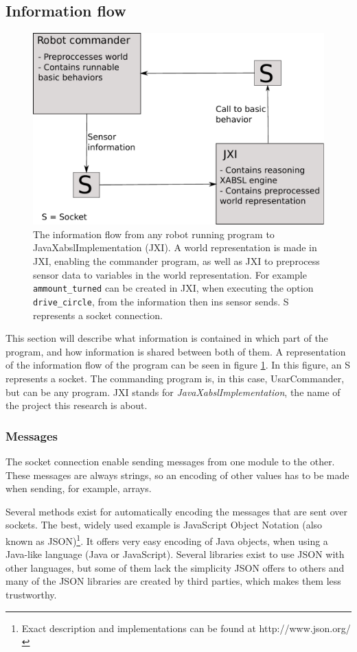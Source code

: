 \documentclass[a4paper,10pt]{article}
\begin{document}
\subsection{Information flow}
\begin{figure}
    \centering
    \includegraphics[width=.8\textwidth]{images/informationFlow.pdf}
    \caption{The information flow from any robot running program to
    JavaXabslImplementation (JXI). A world representation is made in JXI,
    enabling the commander program, as well as JXI to preprocess sensor data to
    variables in the world representation. For example \texttt{ammount\_turned}
    can be created in JXI, when executing the option \texttt{drive\_circle},
    from the information then ins sensor sends. S represents a socket
    connection.}
    \label{fig:information-flow}
\end{figure}
This section will describe what information is contained in which part of the
program, and how information is shared between both of them. A representation of
the information flow of the program can be seen in figure
\ref{fig:information-flow}. In this figure, an S represents a socket. The
commanding program is, in this case, UsarCommander, but can be any program. JXI
stands for \textit{JavaXabslImplementation}, the name of the project this research is
about.

\subsubsection{Messages}
The socket connection enable sending messages from one module to the other.
These messages are always strings, so an encoding of other values has to be made
when sending, for example, arrays.

Several methods exist for automatically encoding the messages that are sent over
sockets. The best, widely used example is JavaScript Object Notation (also known
as JSON)\footnote{Exact description and implementations can be found at
http://www.json.org/}. It offers very easy encoding of Java objects, when using a Java-like
language (Java or JavaScript). Several libraries exist to use JSON with other
languages, but some of them lack the simplicity JSON offers to others and many of
the JSON libraries are created by third parties, which makes them less
trustworthy.
\end{document}
